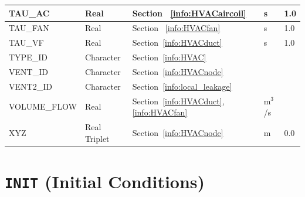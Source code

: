 \documentclass[11pt]{book}
\begin{document}
\begin{longtable}{@{\extracolsep{\fill}}|l|l|l|l|l|}
{\ct TAU\_AC}                   & Real              & Section ~\ref{info:HVACaircoil}                                               & s             & 1.0            \\ \hline
{\ct TAU\_FAN}                  & Real              & Section ~\ref{info:HVACfan}                                                   & s             & 1.0            \\ \hline
{\ct TAU\_VF}                   & Real              & Section~\ref{info:HVACduct}                                                   & s             & 1.0            \\ \hline
{\ct TYPE\_ID}                  & Character         & Section~\ref{info:HVAC}                                                       &               &                \\ \hline
{\ct VENT\_ID}                  & Character         & Section~\ref{info:HVACnode}                                                   &               &                \\ \hline
{\ct VENT2\_ID}                 & Character         & Section~\ref{info:local_leakage}                                              &               &                \\ \hline
{\ct VOLUME\_FLOW}              & Real              & Section~\ref{info:HVACduct}, \ref{info:HVACfan}                               &  m$^3$/s      &                \\ \hline
{\ct XYZ}                       & Real Triplet      & Section~\ref{info:HVACnode}                                                   &  m            &  0.0           \\ \hline
\end{longtable}


\vspace{\baselineskip}



\section{\texorpdfstring{{\tt INIT}}{INIT} (Initial Conditions)}
\end{document}
